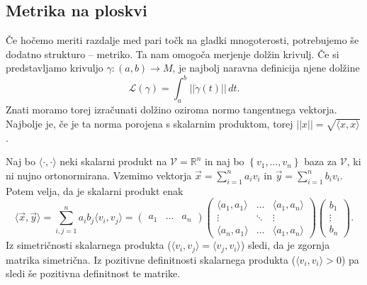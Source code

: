 \subsection{Metrika na ploskvi}%

Če hočemo meriti razdalje med pari točk na gladki
mnogoterosti, potrebujemo še dodatno strukturo --
metriko. Ta nam omogoča merjenje dolžin krivulj. Če si
predstavljamo krivuljo $\gamma : \left( a,b \right)
\to M$, je najbolj naravna definicija njene dolžine \begin{equation*}
\mathcal{L}\left( \gamma \right) = \int_{a}^{b}
\lvert\lvert \dot{\gamma } \left( t \right) \rvert\rvert
\, dt. \end{equation*}Znati moramo torej izračunati dolžino oziroma normo
tangentnega vektorja. Najbolje je, če je ta norma porojena s
skalarnim produktom, torej $\lvert\lvert x \rvert\rvert =
\sqrt{\langle x,x \rangle } $.

Naj bo $\langle \cdot , \cdot  \rangle $  neki skalarni
produkt na $\mathcal{V} = \mathbb{R}^n$ in naj bo $\left\{
v_1, \ldots , v_{n} \right\}$  baza za $\mathcal{V}$, ki ni
nujno ortonormirana. Vzemimo vektorja $\vec{x}  =
\sum_{i=1}^{n} a_{i}v_{i}$ in $\vec{y}  = \sum_{i=1}^{n}
b_{i}v_{i}.$ Potem velja, da je skalarni produkt enak \begin{equation*}
\langle \vec{x} , \vec{y} \rangle = \sum_{i,j = 1}^{n}
a_{i}b_{j}\langle v_{i}, v_{j} \rangle =
\begin{pmatrix}
a_1 & \ldots & a_n
\end{pmatrix}
\begin{pmatrix}
\langle a_1, a_1 \rangle & \dots & \langle a_1, a_n
\rangle \\ \vdots & \ddots & \vdots \\ \langle a_n,
a_1 \rangle & \dots & \langle a_1,a_n \rangle
\end{pmatrix}
\begin{pmatrix} b_1 \\ \vdots \\ b_n
\end{pmatrix}. \end{equation*}
Iz simetričnosti skalarnega produkta
($\langle v_{i}, v_{j} \rangle  = \langle v_{j},  v_{i}
\rangle $) sledi, da je zgornja matrika simetrična. Iz
pozitivne definitnosti skalarnega produkta ($\langle
v_{i}, v_{i} \rangle > 0$) pa sledi še pozitivna 
definitnost te matrike. 

